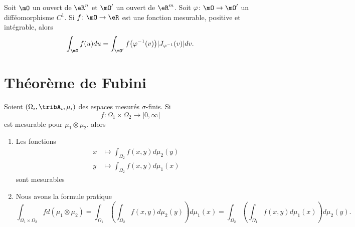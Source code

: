 \begin{theorem} \label{ThomFeRCi}
    Soit \( \mO\) un ouvert de \( \eR^n\) et \( \mO'\) un ouvert de \( \eR^m\). Soit \( \varphi\colon \mO\to \mO'\) un difféomorphisme \( C^1\). Si \( f\colon \mO\to \eR\) est une fonction mesurable, positive et intégrable, alors
    \begin{equation}
        \int_{\mO}f(u)du=\int_{\mO'}f\big( \varphi^{-1}(v) \big)| J_{\varphi^{-1}}(v) |dv.
    \end{equation}
\end{theorem}

\section{Théorème de Fubini}

\begin{theorem}
    Soient \( (\Omega_i,\tribA_i,\mu_i)\) des espaces mesurés $\sigma$-finis. Si
    \begin{equation}
        f\colon \Omega_1\times\Omega_2\to \mathopen[ 0 , \infty \mathclose]
    \end{equation}
    est mesurable pour \( \mu_1\otimes \mu_2\), alors
    \begin{enumerate}
        \item
            Les fonctions
            \begin{subequations}
                \begin{align}
                    x&\mapsto\int_{\Omega_2}f(x,y)d\mu_2(y)\\
                    y&\mapsto\int_{\Omega_2}f(x,y)d\mu_1(x)
                \end{align}
            \end{subequations}
            sont mesurables
        \item
            Nous avons la formule pratique
            \begin{equation}
                \int_{\Omega_1\times\Omega_2}fd(\mu_1\otimes\mu_2)=\int_{\Omega_1}\left( \int_{\Omega_2}f(x,y)d\mu_2(y) \right)d\mu_1(x)
                =\int_{\Omega_2}\left( \int_{\Omega_1}f(x,y)d\mu_1(x) \right)d\mu_2(y).
            \end{equation}
    \end{enumerate}
\end{theorem}


